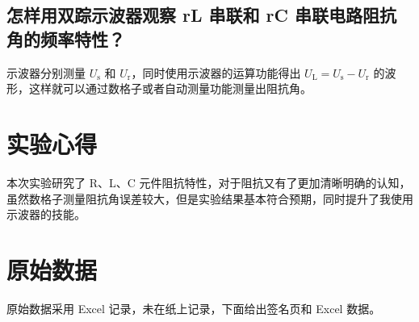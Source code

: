 \documentclass[a4paper,utf8]{article}
\begin{document}
\subsection{怎样用双踪示波器观察 rL 串联和 rC 串联电路阻抗角的频率特性？}
示波器分别测量 $U_\text{s}$ 和 $U_\text{r}$，同时使用示波器的运算功能得出 $U_\text{L}=U_\text{s}-U_\text{r}$ 的波形，这样就可以通过数格子或者自动测量功能测量出阻抗角。
\section{实验心得}
    本次实验研究了 R、L、C 元件阻抗特性，对于阻抗又有了更加清晰明确的认知，虽然数格子测量阻抗角误差较大，但是实验结果基本符合预期，同时提升了我使用示波器的技能。
\clearpage
\section{原始数据}
原始数据采用 Excel 记录，未在纸上记录，下面给出签名页和 Excel 数据。
\begin{center}
\end{center}

\begin{center}
\end{center}
\end{document}
